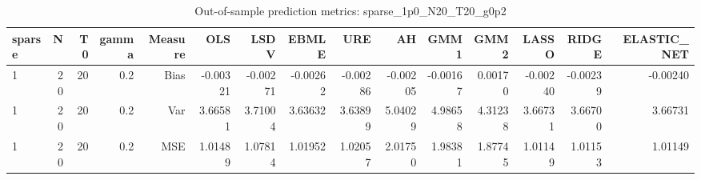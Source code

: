 \begin{table}[!htbp]\centering
\caption{Out-of-sample prediction metrics: sparse_1p0_N20_T20_g0p2}
\label{tab:table3_sparse_1p0_N20_T20_g0p2}
\begin{tabular}{lrrrrrrrrrrrrrr}
\hline
sparse & N & T0 & gamma & Measure & OLS & LSDV & EBMLE & URE & AH & GMM1 & GMM2 & LASSO & RIDGE & ELASTIC_NET \\
\hline
1 & 20 & 20 & 0.2 & Bias & -0.00321 & -0.00271 & -0.00262 & -0.00286 & -0.00205 & -0.00167 & 0.00170 & -0.00240 & -0.00239 & -0.00240 \\
1 & 20 & 20 & 0.2 & Var & 3.66581 & 3.71004 & 3.63632 & 3.63899 & 5.04029 & 4.98658 & 4.31238 & 3.66731 & 3.66700 & 3.66731 \\
1 & 20 & 20 & 0.2 & MSE & 1.01489 & 1.07814 & 1.01952 & 1.02057 & 2.01750 & 1.98381 & 1.87745 & 1.01149 & 1.01153 & 1.01149 \\
\hline
\end{tabular}
\end{table}

